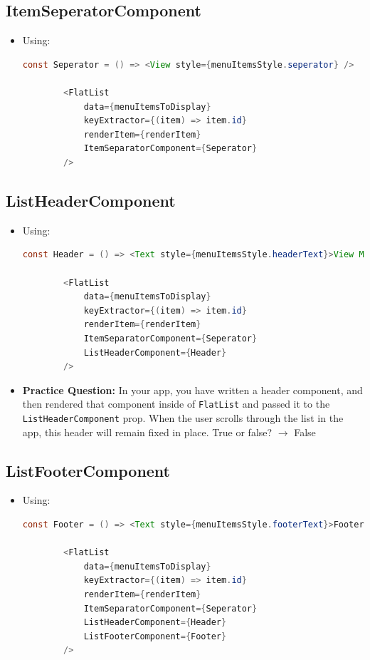 \subsection{ItemSeperatorComponent}
\begin{itemize}
    \item Using: 
    \begin{lstlisting}[language=Java, numbers=none]
        const Seperator = () => <View style={menuItemsStyle.seperator} />

        <FlatList
            data={menuItemsToDisplay}
            keyExtractor={(item) => item.id}
            renderItem={renderItem}
            ItemSeparatorComponent={Seperator}
        />
    \end{lstlisting}
\end{itemize}

\subsection{ListHeaderComponent}
\begin{itemize}
    \item Using: 
    \begin{lstlisting}[language=Java, numbers=none]
        const Header = () => <Text style={menuItemsStyle.headerText}>View Menu</Text>

        <FlatList
            data={menuItemsToDisplay}
            keyExtractor={(item) => item.id}
            renderItem={renderItem}
            ItemSeparatorComponent={Seperator}
            ListHeaderComponent={Header}
        />
    \end{lstlisting}

    \item \textbf{Practice Question:} In your app, you have written a header component, and then rendered that component inside of \texttt{FlatList} and passed it to the \texttt{ListHeaderComponent} prop. When the user scrolls through the list in the app, this header will remain fixed in place. True or false?
    $\rightarrow$ False
\end{itemize}

\subsection{ListFooterComponent}
\begin{itemize}
    \item Using: 
    \begin{lstlisting}[language=Java, numbers=none]
        const Footer = () => <Text style={menuItemsStyle.footerText}>Footer</Text>

        <FlatList
            data={menuItemsToDisplay}
            keyExtractor={(item) => item.id}
            renderItem={renderItem}
            ItemSeparatorComponent={Seperator}
            ListHeaderComponent={Header}
            ListFooterComponent={Footer}
        />
    \end{lstlisting}
\end{itemize}

